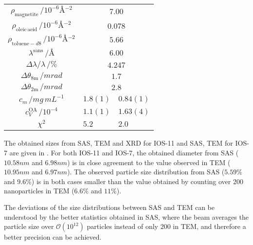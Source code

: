 \documentclass[\main/dresen_thesis.tex]{subfiles}
\begin{document}
\begin{table}[!htbp]
\begin{tabular}{ c | l | l }
        \rule{0pt}{2ex} $\rho_\mathrm{magnetite} \, / \unit{10^{-6} \angstrom^{-2}}$        & \multicolumn{2}{c}{$7.00$}\\
        \rule{0pt}{2ex} $\rho_\mathrm{oleic \, acid} \, / \unit{10^{-6} \angstrom^{-2}}$    & \multicolumn{2}{c}{$0.078$}\\
        \rule{0pt}{2ex} $\rho_{\mathrm{toluene-}d8} \, / \unit{10^{-6} \angstrom^{-2}}$     & \multicolumn{2}{c}{$5.66$}\\
        \rule{0pt}{2ex} $\lambda^\mathrm{sans} \, / \unit{\unit{\angstrom}}$                & \multicolumn{2}{c}{$6.00$}\\
        \rule{0pt}{2ex} $\Delta \lambda / \lambda \, / \unit{\%}$                           & \multicolumn{2}{c}{$4.247$}\\
        \rule{0pt}{2ex} $\Delta \theta_\mathrm{8 m} \, / \unit{mrad}$                       & \multicolumn{2}{c}{$1.7$}\\
        \rule{0pt}{2ex} $\Delta \theta_\mathrm{2 m} \, / \unit{mrad}$                       & \multicolumn{2}{c}{$2.8$}\\
        \hline
        \rule{0pt}{2ex} $c_m \, / \unit{mg\, mL^{-1}}$                                      & $1.8(1)$            & $0.84(1)$\\
        \rule{0pt}{2ex} $c_V^\mathrm{OA} \, / \unit{10^{-4}}$                               & $1.1(1)$            & $1.63(4)$\\
        \hline
        \rule{0pt}{2ex} $\chi^2$                                                            & $5.2$               & $2.0$\\
        \hline
      \end{tabular}
    \end{table}

    The obtained sizes from SAS, TEM and XRD for IOS-11 and SAS, TEM for IOS-7 are given in .
    For both IOS-11 and IOS-7, the obtained diameter from SAS ($10.58 \unit{nm}$ and $6.98 \unit{nm}$) is in close agreement to the value observed in TEM ($10.95 \unit{nm}$ and $6.97 \unit{nm}$).
    The observed particle size distribution from SAS ($5.59 \unit{\%}$ and $9.6 \unit{\%}$) is in both cases smaller than the value obtained by counting over $200$ nanoparticles in TEM ($6.6 \unit{\%}$ and $11 \unit{\%}$).

    The deviations of the size distributions between SAS and TEM can be understood by the better statistics obtained in SAS, where the beam averages the particle size over $\mathcal{O}(10^{12})$ particles instead of only $200$ in TEM, and therefore a better precision can be achieved.
\end{document}
